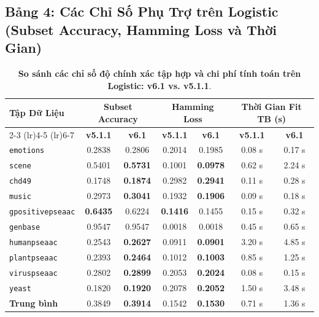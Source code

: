 \documentclass[11pt,a4paper]{article}
\begin{document}
\subsection{Bảng 4: Các Chỉ Số Phụ Trợ trên Logistic (Subset Accuracy, Hamming Loss và Thời Gian)}

\begin{table}[H]
\centering
\small
\caption{\textbf{So sánh các chỉ số độ chính xác tập hợp và chi phí tính toán trên Logistic: v6.1 vs. v5.1.1}.}
\label{tab:secondary_direct}
\begin{tabular}{lcccccc}
\toprule
\multirow{2}{*}{\textbf{Tập Dữ Liệu}} & \multicolumn{2}{c}{\textbf{Subset Accuracy}} & \multicolumn{2}{c}{\textbf{Hamming Loss}} & \multicolumn{2}{c}{\textbf{Thời Gian Fit TB (s)}} \\
\cmidrule(lr){2-3} \cmidrule(lr){4-5} \cmidrule(lr){6-7}
 & \textbf{v5.1.1} & \textbf{v6.1} & \textbf{v5.1.1} & \textbf{v6.1} & \textbf{v5.1.1} & \textbf{v6.1} \\
\midrule
\texttt{emotions} & 0.2838 & 0.2806 & 0.2014 & 0.1985 & 0.08 s & 0.17 s \\
\texttt{scene} & 0.5401 & \textbf{0.5731} & 0.1001 & \textbf{0.0978} & 0.62 s & 2.24 s \\
\texttt{chd49} & 0.1748 & \textbf{0.1874} & 0.2982 & \textbf{0.2941} & 0.11 s & 0.28 s \\
\texttt{music} & 0.2973 & \textbf{0.3041} & 0.1932 & \textbf{0.1906} & 0.09 s & 0.18 s \\
\texttt{gpositivepseaac} & \textbf{0.6435} & 0.6224 & \textbf{0.1416} & 0.1455 & 0.15 s & 0.32 s \\
\texttt{genbase} & 0.9547 & 0.9547 & 0.0018 & 0.0018 & 0.45 s & 0.65 s \\
\texttt{humanpseaac} & 0.2543 & \textbf{0.2627} & 0.0911 & \textbf{0.0901} & 3.20 s & 4.85 s \\
\texttt{plantpseaac} & 0.2393 & \textbf{0.2464} & 0.1012 & \textbf{0.1003} & 0.85 s & 1.25 s \\
\texttt{viruspseaac} & 0.2802 & \textbf{0.2899} & 0.2053 & \textbf{0.2024} & 0.08 s & 0.15 s \\
\texttt{yeast} & 0.1820 & \textbf{0.1920} & 0.2078 & \textbf{0.2052} & 1.50 s & 3.48 s \\
\midrule
\textbf{Trung bình} & 0.3849 & \textbf{0.3914} & 0.1542 & \textbf{0.1530} & 0.71 s & 1.36 s \\
\bottomrule
\end{tabular}
\end{table}
\end{document}
